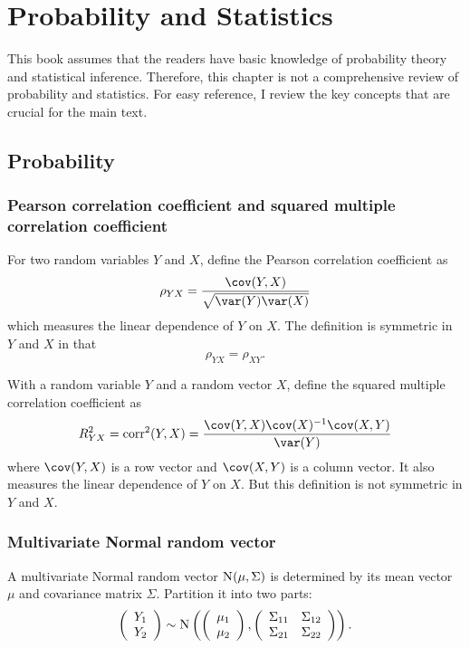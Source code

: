 
\chapter{Probability and Statistics}
 \label{chapter::basic-prob-append}
 
 
This book assumes that the readers have basic knowledge of probability theory and statistical inference. Therefore, this chapter is not a comprehensive review of probability and statistics. For easy reference, I review the key concepts that are crucial for the main text.  
 
 

\section{Probability}



\subsection{Pearson correlation coefficient and squared multiple correlation coefficient}
\label{sec::measure-pearson-r2}

For two random variables $Y$ and $X$, define the Pearson correlation coefficient as
$$
\rho_{YX} = \frac{  \cov(Y, X)  }{  \sqrt{  \var(Y)   \var(X) }   }
$$
which measures the linear dependence of $Y$ on $X$. The definition is symmetric in $Y$ and $X$ in that
$$
\rho_{YX}  = \rho_{XY} .
$$


With a random variable $Y$ and a random vector $X$, define the squared multiple correlation coefficient as
$$
R^2_{YX} = \textup{corr}^2(Y, X )
= \frac{   \cov(Y, X) \cov(X)^{-1} \cov(X, Y)  }{  \var(Y) }
$$
where $\cov(Y, X) $ is a row vector and $\cov(X, Y)$ is a column vector. It also measures the linear dependence of $Y$ on $X$. But this definition is not symmetric in $Y$ and $X$.



\subsection{Multivariate Normal random vector}
\label{sec::multivariate-normal}
 
A multivariate Normal random vector $\textsc{N}(\mu, \Sigma)$ is determined by its mean vector $\mu$ and covariance matrix $\Sigma$. Partition it into two parts: 
\[
\left(\begin{array}{c}
Y_{1}\\
Y_{2}
\end{array}\right)\sim\textsc{N}\left(\left(\begin{array}{c}
\mu_{1}\\
\mu_{2}
\end{array}\right),\left(\begin{array}{cc}
\Sigma_{11} & \Sigma_{12}\\
\Sigma_{21} & \Sigma_{22}
\end{array}\right)\right).
\]

